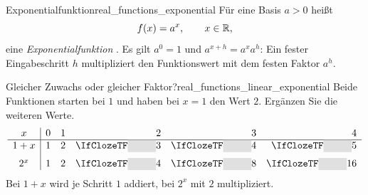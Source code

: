 \par\noindent\begin{minipage}{\linewidth}
\begin{DefinitionBox}{Exponentialfunktion}{real_functions_exponential}
  Für eine Basis $a>0$ heißt
  \[
    f(x)=a^x,\qquad x\in\mathbb{R},
  \]
  eine \emph{Exponentialfunktion} .
  Es gilt $a^0=1$ und $a^{x+h}=a^x a^h$: Ein fester Eingabeschritt $h$
  multipliziert den Funktionswert mit dem festen Faktor $a^h$.
\end{DefinitionBox}
\begin{ExampleBox}[before skip=0.3\baselineskip]{Gleicher Zuwachs oder gleicher Faktor?}{real_functions_linear_exponential}
  Beide Funktionen starten bei $1$ und haben bei $x=1$ den Wert $2$.
  Ergänzen Sie die weiteren Werte.
  \[
    \begin{array}{c|rrrrr}
      x&0&1&2&3&4\\ \hline
      1+x&1&2&\Cloze{1cm}{3}&\Cloze{1cm}{4}&\Cloze{1cm}{5}\\[0.6em]
      2^x&1&2&\Cloze{1cm}{4}&\Cloze{1cm}{8}&\Cloze{1cm}{16}
    \end{array}
  \]
  Bei $1+x$ wird je Schritt $1$ addiert, bei $2^x$ mit $2$ multipliziert.
\end{ExampleBox}
\end{minipage}

\begin{center}
\end{center}

\clearpage
